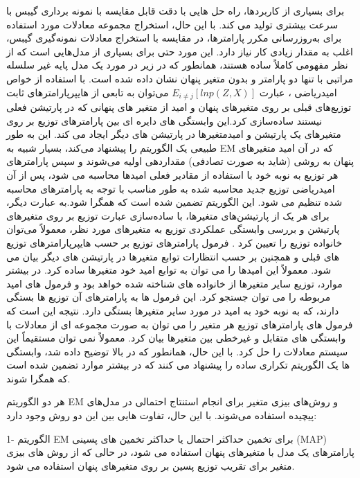 \begin{flushright}
برای بسیاری از کاربردها،  راه حل هایی با دقت قابل مقایسه با نمونه برداری گیبس با سرعت بیشتری تولید می کند. با این حال، استخراج مجموعه معادلات مورد استفاده برای به‌روزرسانی مکرر پارامترها، در مقایسه با استخراج معادلات نمونه‌گیری گیبس، اغلب به مقدار زیادی کار نیاز دارد. این مورد حتی برای بسیاری از مدل‌هایی است که از نظر مفهومی کاملاً ساده هستند، همانطور که در زیر در مورد یک مدل پایه غیر سلسله مراتبی با تنها دو پارامتر و بدون متغیر پنهان نشان داده شده است.
با استفاده از خواص امیدریاضی ، عبارت 
$  E_{i \neq j}[ln p(Z,X)]  $
می‌توان به تابعی از هایپرپارامترهای ثابت توزیع‌های قبلی بر روی متغیرهای پنهان و امید از متغیر های پنهانی که در پارتیشن فعلی نیستند ساده‌سازی کرد.این وابستگی های دایره ای بین پارامترهای توزیع بر روی متغیرهای یک پارتیشن و امیدمتغیرها در پارتیشن های دیگر ایجاد می کند. این به طور طبیعی یک الگوریتم  را پیشنهاد می‌کند، بسیار شبیه به EM  که در آن امید متغیرهای پنهان به روشی (شاید به صورت تصادفی) مقداردهی اولیه می‌شوند و سپس پارامترهای هر توزیع به نوبه خود با استفاده از مقادیر فعلی امیدها محاسبه می شود، پس از آن امیدریاضی توزیع جدید محاسبه شده به طور مناسب با توجه به پارامترهای محاسبه شده تنظیم می شود. این الگوریتم تضمین شده است که همگرا شود.به عبارت دیگر، برای هر یک از پارتیشن‌های متغیرها، با ساده‌سازی عبارت توزیع بر روی متغیرهای پارتیشن و بررسی وابستگی عملکردی توزیع به متغیرهای مورد نظر، معمولاً می‌توان خانواده توزیع را تعیین کرد . فرمول پارامترهای توزیع بر حسب هایپرپارامترهای توزیع های قبلی و همچنین بر حسب انتظارات توابع متغیرها در پارتیشن های دیگر بیان می شود. معمولاً این امیدها را می توان به توابع امید خود متغیرها ساده کرد. در بیشتر موارد، توزیع سایر متغیرها از خانواده های شناخته شده خواهد بود و فرمول های امید مربوطه را می توان جستجو کرد. این فرمول ها به پارامترهای آن توزیع ها بستگی دارند، که به نوبه خود به امید در مورد سایر متغیرها بستگی دارد. نتیجه این است که فرمول های پارامترهای توزیع هر متغیر را می توان به صورت مجموعه ای از معادلات با وابستگی های متقابل و غیرخطی بین متغیرها بیان کرد. معمولاً نمی توان مستقیماً این سیستم معادلات را حل کرد. با این حال، همانطور که در بالا توضیح داده شد، وابستگی ها یک الگوریتم تکراری ساده را پیشنهاد می کنند که در بیشتر موارد تضمین شده است که همگرا شوند.

هر دو الگوریتم EM و روش‌های بیزی متغیر برای انجام استنتاج احتمالی در مدل‌های پیچیده استفاده می‌شوند. با این حال، تفاوت هایی بین این دو روش وجود دارد:

1- الگوریتم EM برای تخمین حداکثر احتمال یا حداکثر تخمین های پسینی (MAP) پارامترهای یک مدل با متغیرهای پنهان استفاده می شود، در حالی که از روش های بیزی متغیر برای تقریب توزیع پسین بر روی متغیرهای پنهان استفاده می شود.


\end{flushright}
